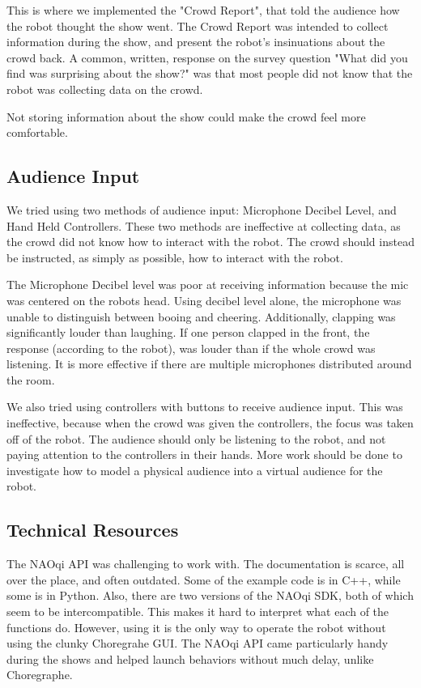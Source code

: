     This is where we implemented the "Crowd Report", that told the audience how the robot thought the show went.
    The Crowd Report was intended to collect information during the show, and present the robot's insinuations about the crowd back.
    A common, written, response on the survey question "What did you find was surprising about the show?" was that most people did not know that the robot was collecting data on the crowd.


    Not storing information about the show could make the crowd feel more comfortable.


\subsection{Audience Input}
    We tried using two methods of audience input: Microphone Decibel Level, and Hand Held Controllers.
    These two methods are ineffective at collecting data, as the crowd did not know how to interact with the robot.
    The crowd should instead be instructed, as simply as possible, how to interact with the robot.


    The Microphone Decibel level was poor at receiving information because the mic was centered on the robots head.
    Using decibel level alone, the microphone was unable to distinguish between booing and cheering.
    Additionally, clapping was significantly louder than laughing.
    If one person clapped in the front, the response (according to the robot), was louder than if the whole crowd was listening.
    It is more effective if there are multiple microphones distributed around the room.


    We also tried using controllers with buttons to receive audience input.
    This was ineffective, because when the crowd was given the controllers, the focus was taken off of the robot.
    The audience should only be listening to the robot, and not paying attention to the controllers in their hands.
    More work should be done to investigate how to model a physical audience into a virtual audience for the robot.

\subsection{Technical Resources}

    The NAOqi API was challenging to work with. The documentation is scarce, all over the place, and often outdated.
    Some of the example code is in C++, while some is in Python. Also, there are two versions of the NAOqi SDK, both of which seem to be intercompatible.
    This makes it hard to interpret what each of the functions do.
    However, using it is the only way to operate the robot without using the clunky Choregrahe GUI.
    The NAOqi API came particularly handy during the shows and helped launch behaviors without much delay, unlike Choregraphe.

